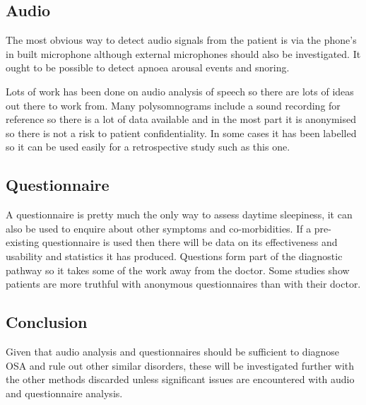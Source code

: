 \subsection{Audio}
The most obvious way to detect audio signals from the patient is via the phone’s in built microphone although external microphones should also be investigated. It ought to be possible to detect apnoea arousal events and snoring. 

Lots of work has been done on audio analysis of speech so there are lots of ideas out there to work from. Many polysomnograms include a sound recording for reference so there is a lot of data available and in the most part it is anonymised so there is not a risk to patient confidentiality. In some cases it has been labelled so it can be used easily for a retrospective study such as this one. 

\subsection{Questionnaire}
A questionnaire is pretty much the only way to assess daytime sleepiness, it can also be used to enquire about other symptoms and co-morbidities. If a pre-existing questionnaire is used then there will be data on its effectiveness and usability and statistics it has produced. Questions form part of the diagnostic pathway so it takes some of the work away from the doctor. Some studies show patients are more truthful with anonymous questionnaires than with their doctor. 

\subsection{Conclusion}
Given that audio analysis and questionnaires should be sufficient to diagnose OSA and rule out other similar disorders, these will be investigated further with the other methods discarded unless significant issues are encountered with audio and questionnaire analysis. 
